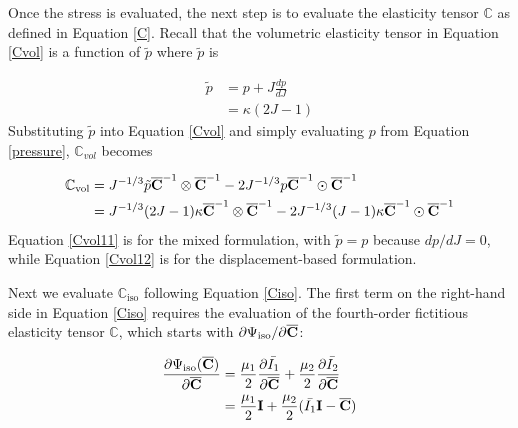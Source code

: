 Once the stress is evaluated, the next step is to evaluate the elasticity tensor $\mathbb{C}$ as defined in Equation \ref{C}. Recall that the volumetric elasticity tensor in Equation \ref{Cvol} is a function of $\tilde{p}$ where $\tilde{p}$ is

\begin{equation}
\begin{split}
\tilde{p} &= p + J\frac{dp}{dJ} \\
             &= \kappa{(2J - 1)}
\end{split}
\end{equation}
Substituting $\tilde{p}$ into Equation \ref{Cvol} and simply evaluating $p$ from Equation \ref{pressure}, $\mathbb{C}_{vol}$ becomes

\begin{subequations} \label{Cvol1}
\begin{align}
\mathbb{C}_\mathrm{vol} &= J^{-1/3}\tilde{p}{\overline{\bold{C}}}^{-1}\otimes{\overline{\bold{C}}}^{-1} - 2J^{-1/3}p{\overline{\bold{C}}}^{-1}\odot{\overline{\bold{C}}}^{-1} \label{Cvol11} \\
&=  J^{-1/3}(2J-1)\kappa \overline{\bold{C}}^{-1} \otimes \overline{\bold{C}}^{-1} - 2J^{-1/3}(J-1)\kappa \overline{\bold{C}}^{-1} \odot \overline{\bold{C}}^{-1} \label{Cvol12}
\end{align}
\end{subequations} 
Equation \ref{Cvol11} is for the mixed formulation, with $\tilde{p} = p$ because $dp/dJ = 0$, while Equation \ref{Cvol12} is for the displacement-based formulation.

Next we evaluate $\mathbb{C}_\mathrm{iso}$ following Equation \ref{Ciso}. The first term on the right-hand side in Equation \ref{Ciso} requires the evaluation of the fourth-order fictitious elasticity tensor $\mathbb{C}$, which starts with ${\partial{\Psi_\mathrm{iso}}}/{\partial{\overline{\bold{C}}}}$:

\begin{equation}
\begin{split}
\frac{\partial{\Psi_\mathrm{iso}(\overline{\bold{C}})}}{\partial{\overline{\bold{C}}}} &= \frac{\mu_1}{2}\frac{\partial{\bar{I_1}}}{\partial{\overline{\bold{C}}}} +  \frac{\mu_2}{2}\frac{\partial{\bar{I_2}}}{\partial{\overline{\bold{C}}}} \\
&= \frac{\mu_1}{2}\bold{I} + \frac{\mu_2}{2}(\bar{I_1}\bold{I} - \overline{\bold{C}})
\end{split}
\end{equation}

